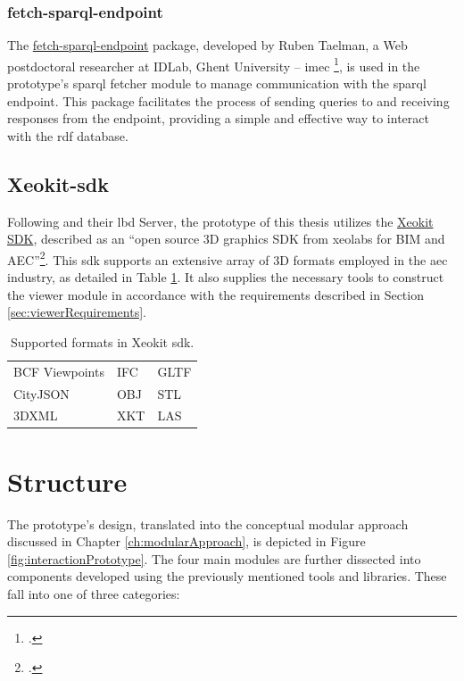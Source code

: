 \subsubsection{fetch-sparql-endpoint}
The \href{https://github.com/rubensworks/fetch-sparql-endpoint.js}{fetch-sparql-endpoint} package, developed by Ruben Taelman, a Web postdoctoral researcher at IDLab, Ghent University – imec \footcite{RubenTaelman}, is used in the prototype's \ac{sparql} fetcher module to manage communication with the \ac{sparql} endpoint. This package facilitates the process of sending queries to and receiving responses from the endpoint, providing a simple and effective way to interact with the \ac{rdf} database.

\subsection{Xeokit-\acs{sdk}}
Following \cite{Malcolm2021} and their \ac{lbd} Server, the prototype of this thesis utilizes the \href{http://xeokit.io/index.html}{Xeokit SDK}, described as an \enquote{open source 3D graphics SDK from xeolabs for BIM and AEC}\footcite{xeokit}. This \ac{sdk} supports an extensive array of 3D formats employed in the \ac{aec} industry, as detailed in Table \ref{tab:xeokitFormats}. It also supplies the necessary tools to construct the viewer module in accordance with the requirements described in Section \ref{sec:viewerRequirements}.

\begin{table}[H]
    \centering
    \begin{tabular}{lll}
        \toprule
        BCF Viewpoints & IFC & GLTF \\
        CityJSON       & OBJ & STL  \\
        3DXML          & XKT & LAS  \\
        \bottomrule
    \end{tabular}
    \caption[Supported formats in Xeokit \acs{sdk}]{Supported formats in Xeokit \acs{sdk}.\footnotemark}
    \label{tab:xeokitFormats}
\end{table}

\section{Structure}
The prototype's design, translated into the conceptual modular approach discussed in Chapter \ref{ch:modularApproach}, is depicted in Figure \ref{fig:interactionPrototype}. The four main modules are further dissected into components developed using the previously mentioned tools and libraries. These fall into one of three categories:


